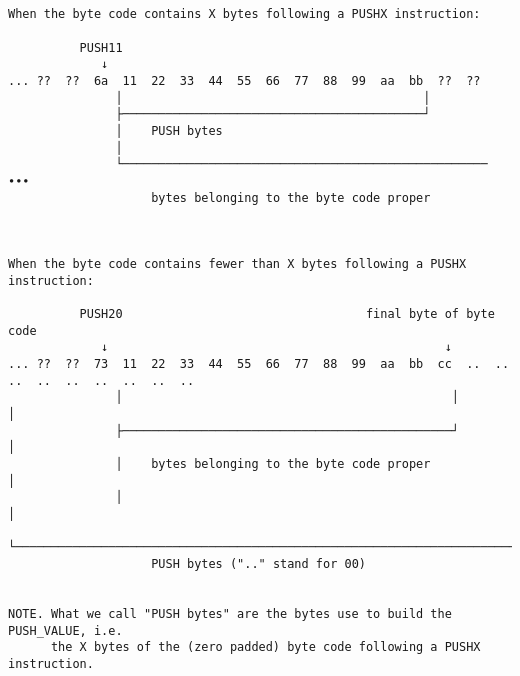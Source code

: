 \documentclass[varwidth=\maxdimen,margin=0.5cm,multi={verbatim}]{standalone}
\begin{document}
\begin{verbatim}


When the byte code contains X bytes following a PUSHX instruction:

          PUSH11
             ↓
... ??  ??  6a  11  22  33  44  55  66  77  88  99  aa  bb  ??  ??
               │                                          │
               ├──────────────────────────────────────────┘
               │    PUSH bytes
               │
               └───────────────────────────────────────────────────  ∙∙∙
                    bytes belonging to the byte code proper



When the byte code contains fewer than X bytes following a PUSHX instruction:

          PUSH20                                  final byte of byte code
             ↓                                               ↓
... ??  ??  73  11  22  33  44  55  66  77  88  99  aa  bb  cc  ..  ..  ..  ..  ..  ..  ..  ..  ..
               │                                              │                               │
               ├──────────────────────────────────────────────┘                               │
               │    bytes belonging to the byte code proper                                   │
               │                                                                              │
               └──────────────────────────────────────────────────────────────────────────────┘
                    PUSH bytes (".." stand for 00)


NOTE. What we call "PUSH bytes" are the bytes use to build the PUSH_VALUE, i.e.
      the X bytes of the (zero padded) byte code following a PUSHX instruction.

\end{verbatim}
\end{document}
